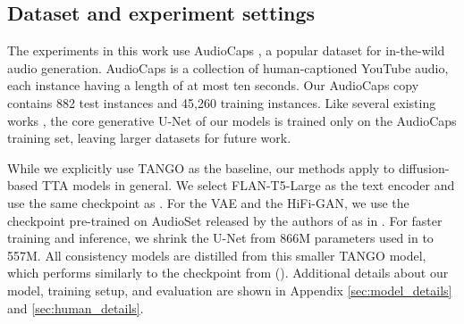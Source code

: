 \documentclass{article}
\begin{document}
\subsection{Dataset and experiment settings}

The experiments in this work use AudioCaps \cite{audiocaps}, a popular dataset for in-the-wild audio generation. AudioCaps is a collection of human-captioned YouTube audio, each instance having a length of at most ten seconds. Our AudioCaps copy contains 882 test instances and 45,260 training instances. Like several existing works \cite{tango, audioldm}, the core generative U-Net of our models is trained only on the AudioCaps training set, leaving larger datasets for future work.

While we explicitly use TANGO \cite{tango} as the baseline, our methods apply to diffusion-based TTA models in general. We select FLAN-T5-Large \cite{flan} as the text encoder and use the same checkpoint as \cite{tango}. For the VAE and the HiFi-GAN, we use the checkpoint pre-trained on AudioSet released by the authors of \cite{audioldm} as in \cite{tango}. For faster training and inference, we shrink the U-Net from 866M parameters used in \cite{tango} to 557M. All consistency models are distilled from this smaller TANGO model, which performs similarly to the checkpoint from \cite{tango} (). Additional details about our model, training setup, and evaluation are shown in Appendix \ref{sec:model_details} and \ref{sec:human_details}.
\end{document}
